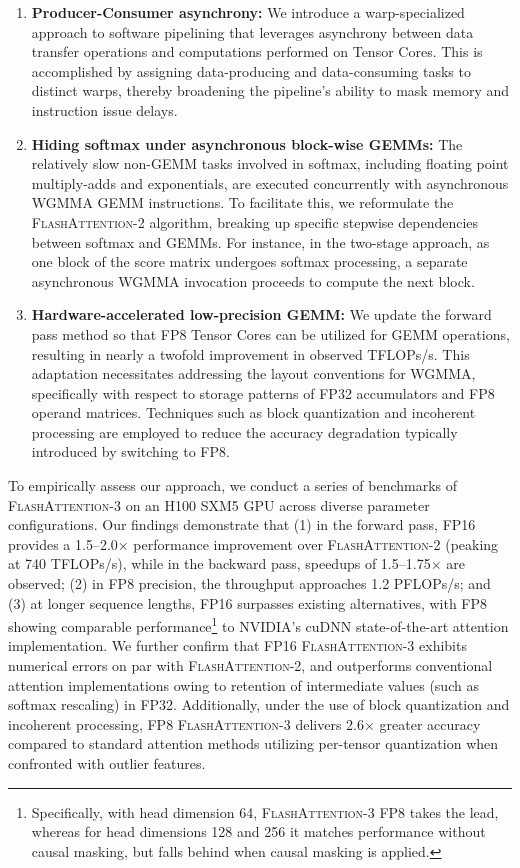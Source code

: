 \begin{enumerate}

\item \textbf{Producer-Consumer asynchrony:} We introduce a warp-specialized approach to software pipelining that leverages asynchrony between data transfer operations and computations performed on Tensor Cores. This is accomplished by assigning data-producing and data-consuming tasks to distinct warps, thereby broadening the pipeline’s ability to mask memory and instruction issue delays.
\item \textbf{Hiding softmax under asynchronous block-wise GEMMs:} The relatively slow non-GEMM tasks involved in softmax, including floating point multiply-adds and exponentials, are executed concurrently with asynchronous WGMMA GEMM instructions. To facilitate this, we reformulate the \textsc{FlashAttention-2} algorithm, breaking up specific stepwise dependencies between softmax and GEMMs. For instance, in the two-stage approach, as one block of the score matrix undergoes softmax processing, a separate asynchronous WGMMA invocation proceeds to compute the next block.
\item \textbf{Hardware-accelerated low-precision GEMM:} We update the forward pass method so that FP8 Tensor Cores can be utilized for GEMM operations, resulting in nearly a twofold improvement in observed TFLOPs/s. This adaptation necessitates addressing the layout conventions for WGMMA, specifically with respect to storage patterns of FP32 accumulators and FP8 operand matrices. Techniques such as block quantization and incoherent processing are employed to reduce the accuracy degradation typically introduced by switching to FP8.
\end{enumerate}

To empirically assess our approach, we conduct a series of benchmarks of \textsc{FlashAttention-3} on an H100 SXM5 GPU across diverse parameter configurations. Our findings demonstrate that (1) in the forward pass, FP16 provides a 1.5–2.0$\times$ performance improvement over \textsc{FlashAttention-2} (peaking at 740 TFLOPs/s), while in the backward pass, speedups of 1.5–1.75$\times$ are observed; (2) in FP8 precision, the throughput approaches 1.2 PFLOPs/s; and (3) at longer sequence lengths, FP16 surpasses existing alternatives, with FP8 showing comparable performance\footnote{Specifically, with head dimension 64, \textsc{FlashAttention-3} FP8 takes the lead, whereas for head dimensions 128 and 256 it matches performance without causal masking, but falls behind when causal masking is applied.} to NVIDIA's cuDNN state-of-the-art attention implementation. We further confirm that FP16 \textsc{FlashAttention-3} exhibits numerical errors on par with \textsc{FlashAttention-2}, and outperforms conventional attention implementations owing to retention of intermediate values (such as softmax rescaling) in FP32. Additionally, under the use of block quantization and incoherent processing, FP8 \textsc{FlashAttention-3} delivers 2.6$\times$ greater accuracy compared to standard attention methods utilizing per-tensor quantization when confronted with outlier features.

